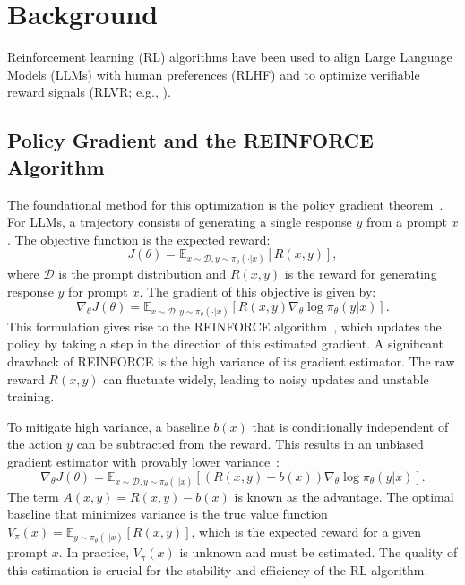 \section{Background}

Reinforcement learning (RL) algorithms have been used to align Large Language Models (LLMs) with human preferences (RLHF) and to optimize verifiable reward signals (RLVR; e.g., \cite{RLVR,GRPO}). 

\subsection{Policy Gradient and the REINFORCE Algorithm}
The foundational method for this optimization is the policy gradient theorem~\cite{REINFORCE,rlbook}. For LLMs, a trajectory consists of generating a single response $y$ from a prompt $x$. The objective function is the expected reward:
\begin{equation}
    J(\theta) = \mathbb{E}_{x \sim \mathcal{D}, y \sim \pi_\theta(\cdot|x)}[R(x,y)],
\end{equation}
where $\mathcal{D}$ is the prompt distribution and $R(x,y)$ is the reward for generating response $y$ for prompt $x$. The gradient of this objective is given by:
\begin{equation}
    \nabla_\theta J(\theta) = \mathbb{E}_{x \sim \mathcal{D}, y \sim \pi_\theta(\cdot|x)}[R(x,y) \nabla_\theta \log \pi_\theta(y|x)].
\end{equation}
This formulation gives rise to the REINFORCE algorithm~\cite{REINFORCE,rlbook}, which updates the policy by taking a step in the direction of this estimated gradient. A significant drawback of REINFORCE is the high variance of its gradient estimator. The raw reward $R(x,y)$ can fluctuate widely, leading to noisy updates and unstable training.

To mitigate high variance, a baseline $b(x)$ that is conditionally independent of the action $y$ can be subtracted from the reward. This results in an unbiased gradient estimator with provably lower variance~\cite{greensmith2004variance}:
\begin{equation}
    \nabla_\theta J(\theta) = \mathbb{E}_{x \sim \mathcal{D}, y \sim \pi_\theta(\cdot|x)}[(R(x,y) - b(x)) \nabla_\theta \log \pi_\theta(y|x)].
\end{equation}
The term $A(x,y) = R(x,y) - b(x)$ is known as the advantage. The optimal baseline that minimizes variance is the true value function $V_\pi(x) = \mathbb{E}_{y \sim \pi_\theta(\cdot|x)}[R(x,y)]$, which is the expected reward for a given prompt $x$. In practice, $V_\pi(x)$ is unknown and must be estimated. The quality of this estimation is crucial for the stability and efficiency of the RL algorithm.

